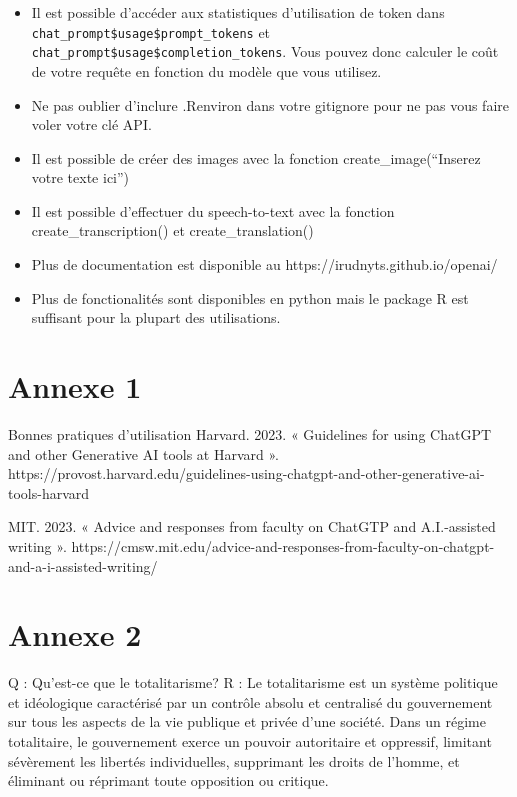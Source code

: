 \documentclass[
  letterpaper,
  DIV=11,
  numbers=noendperiod]{scrreprt}
\begin{document}
\begin{itemize}
\item
  Il est possible d'accéder aux statistiques d'utilisation de token dans
  \texttt{chat\_prompt\$usage\$prompt\_tokens} et
  \texttt{chat\_prompt\$usage\$completion\_tokens}. Vous pouvez donc
  calculer le coût de votre requête en fonction du modèle que vous
  utilisez.
\item
  Ne pas oublier d'inclure .Renviron dans votre gitignore pour ne pas
  vous faire voler votre clé API.
\item
  Il est possible de créer des images avec la fonction
  create\_image(``Inserez votre texte ici'')
\item
  Il est possible d'effectuer du speech-to-text avec la fonction
  create\_transcription() et create\_translation()
\item
  Plus de documentation est disponible au
  https://irudnyts.github.io/openai/
\item
  Plus de fonctionalités sont disponibles en python mais le package R
  est suffisant pour la plupart des utilisations.
\end{itemize}

\section{Annexe 1}\label{annexe-1}

Bonnes pratiques d'utilisation Harvard. 2023. « Guidelines for using
ChatGPT and other Generative AI tools at Harvard ».
https://provost.harvard.edu/guidelines-using-chatgpt-and-other-generative-ai-tools-harvard

MIT. 2023. « Advice and responses from faculty on ChatGTP and
A.I.-assisted writing ».
https://cmsw.mit.edu/advice-and-responses-from-faculty-on-chatgpt-and-a-i-assisted-writing/

\section{Annexe 2}\label{annexe-2}

Q : Qu'est-ce que le totalitarisme? R : Le totalitarisme est un système
politique et idéologique caractérisé par un contrôle absolu et
centralisé du gouvernement sur tous les aspects de la vie publique et
privée d'une société. Dans un régime totalitaire, le gouvernement exerce
un pouvoir autoritaire et oppressif, limitant sévèrement les libertés
individuelles, supprimant les droits de l'homme, et éliminant ou
réprimant toute opposition ou critique.
\end{document}
